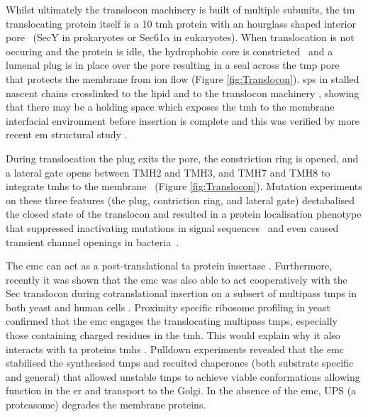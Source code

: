 Whilst ultimately the translocon machinery is built of multiple subunits, the \gls{tm} translocating protein itself is a 10 \gls{tmh} protein with an hourglass shaped interior pore~\cite{Berg2004} (SecY in prokaryotes or Sec61$\alpha$ in eukaryotes).
When translocation is not occuring and the protein is idle, the hydrophobic core is constricted~\cite{Junne2010} and a lumenal plug is in place over the pore resulting in a seal across the \gls{tmp} pore~\cite{Tam2005, Junne2006} that protects the membrane from ion flow \cite{Park2011} (Figure \ref{fig:Translocon}).
\gls{sp}s in stalled nascent chains crosslinked to the lipid and to the translocon machinery \cite{Martoglio1995}, showing that there may be a holding space which exposes the \gls{tmh} to the membrane  interfacial environment before insertion is complete and this was verified by more recent \gls{em} structural study \cite{Gogala2014, Park2012}.

During translocation the plug exits the pore, the constriction ring is opened, and a lateral gate opens between TMH2 and TMH3, and TMH7 and TMH8 to integrate \gls{tmh}s to the membrane~\cite{Berg2004, Petriman2018, Hizlan2012, Bischoff2014, Gogala2014, Egea2010} (Figure \ref{fig:Translocon}).
Mutation experiments on these three features (the plug, contriction ring, and lateral gate) destabalised the closed state of the translocon and resulted in a protein localisation phenotype that suppressed inactivating mutations in signal sequences~\cite{Emr1981, Veenendaal2004, Li2007, Junne2007} and even caused transient channel openings in bacteria~\cite{Saparov2007}.

The \gls{emc} can act as a post\--translational \gls{ta} protein insertase \cite{Guna2018}.
Furthermore, recently it was shown that the \gls{emc} was also able to act cooperatively with the Sec translocon during cotranslational insertion on a subsert of multipass \gls{tmp}s in both yeast and human cells \cite{Shurtleff2018}.
Proximity specific ribosome profiling in yeast confirmed that the \gls{emc} engages the translocating multipass \gls{tmp}s, especially those containing charged residues in the \gls{tmh}.
This would explain why it also interacts with \gls{ta} proteins \gls{tmh}s \cite{Guna2018, Shurtleff2018}.
Pulldown experiments revealed that the \gls{emc} stabilised the synthesised \gls{tmp}s and recuited chaperones (both substrate specific and general) that allowed unstable \gls{tmp}s to achieve viable conformations allowing function in the \gls{er} and transport to the Golgi.
In the absence of the \gls{emc}, UPS (a proteasome) degrades the membrane proteins.

